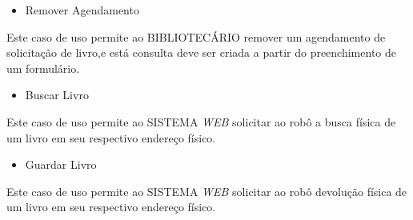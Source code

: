 \begin{itemize}
\item{Remover Agendamento}
\end{itemize}

Este caso de uso permite ao BIBLIOTECÁRIO remover um agendamento de solicitação de livro,e está consulta deve ser criada a partir do preenchimento de um formulário.

\begin{itemize}
\item{Buscar Livro}
\end{itemize}

Este caso de uso permite ao SISTEMA \textit{WEB} solicitar ao robô a busca física de um livro em seu respectivo endereço físico.

\begin{itemize}
\item{Guardar Livro}
\end{itemize}

Este caso de uso permite ao SISTEMA \textit{WEB} solicitar ao robô devolução física de um livro em seu respectivo endereço físico.

